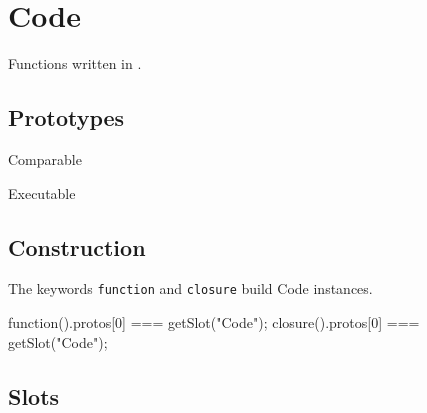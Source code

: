 
\section{Code}

Functions written in \us.

\subsection{Prototypes}

\begin{refObjects}
\item[Comparable]
\item[Executable]
\end{refObjects}

\subsection{Construction}

The keywords \lstinline|function| and \lstinline|closure| build Code
instances.

\begin{urbiassert}
function(){}.protos[0] === getSlot("Code");
closure(){}.protos[0] === getSlot("Code");
\end{urbiassert}

\subsection{Slots}

